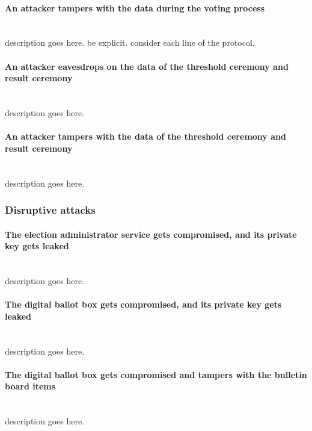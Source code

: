\paragraph{An attacker tampers with the data during the voting process} \mbox{} \\
description goes here.
be explicit.
consider each line of the protocol.


\paragraph{An attacker eavesdrops on the data of the threshold ceremony and result ceremony} \mbox{} \\
description goes here.


\paragraph{An attacker tampers with the data of the threshold ceremony and result ceremony} \mbox{} \\
description goes here.


\subsubsection{Disruptive attacks} \label{sec: disruptive attacks}

\paragraph{The election administrator service gets compromised, and its private key gets leaked} \mbox{} \\
description goes here.


\paragraph{The digital ballot box gets compromised, and its private key gets leaked} \mbox{} \\
description goes here.


\paragraph{The digital ballot box gets compromised and tampers with the bulletin board items} \mbox{} \\
description goes here.
